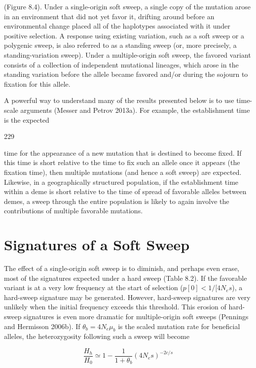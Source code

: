\documentclass{article}
\begin{document}
(Figure 8.4). Under a single-origin soft sweep, a single copy of the mutation arose in an environment that did not yet favor it, drifting around before an environmental change placed all of the haplotypes associated with it under positive selection. A response using existing variation, such as a soft sweep or a polygenic sweep, is also referred to as a standing sweep (or, more precisely, a standing-variation sweep). Under a multiple-origin soft sweep, the favored variant consists of a collection of independent mutational lineages, which arose in the standing variation before the allele became favored and/or during the sojourn to fixation for this allele.

A powerful way to understand many of the results presented below is to use time-scale arguments (Messer and Petrov 2013a). For example, the establishment time is the expected

229

time for the appearance of a new mutation that is destined to become fixed. If this time is short relative to the time to fix such an allele once it appears (the fixation time), then multiple mutations (and hence a soft sweep) are expected. Likewise, in a geographically structured population, if the establishment time within a deme is short relative to the time of spread of favorable alleles between demes, a sweep through the entire population is likely to again involve the contributions of multiple favorable mutations.

\section{Signatures of a Soft Sweep}
The effect of a single-origin soft sweep is to diminish, and perhaps even erase, most of the signatures expected under a hard sweep (Table 8.2). If the favorable variant is at a very low frequency at the start of selection ($p[0] < 1/[4N_{e}s$), a hard-sweep signature may be generated. However, hard-sweep signatures are very unlikely when the initial frequency exceeds this threshold. This erosion of hard-sweep signatures is even more dramatic for multiple-origin soft sweeps (Pennings and Hermisson 2006b). If $\theta_{b} = 4N_{e}\mu_{b}$ is the scaled mutation rate for beneficial alleles, the heterozygosity following such a sweep will become

\begin{equation}
\frac{H_{h}}{H_{0}}\simeq1-\frac{1}{1+\theta_{b}}(4N_{e}s)^{-2c/s}
\tag{8.16a}
\label{eq:8_16a}
\end{equation}
\end{document}
